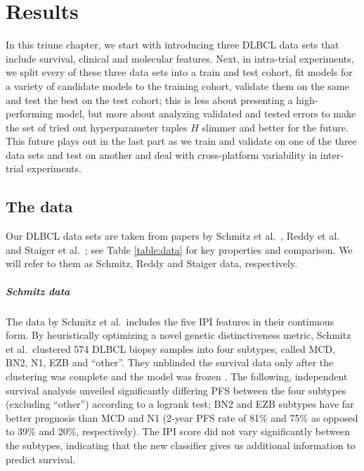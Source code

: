 \chapter{Results} \label{chap:results}

In this triune chapter, we start with introducing three DLBCL data sets that include 
survival, clinical and molecular features. Next, in intra-trial experiments, we split every of these 
three data sets into 
a train and test cohort, fit models for a variety of candidate models to the training 
cohort, validate them on the same and test the best on the test cohort; this is less about presenting a 
high-performing model, but more about analyzing validated and tested errors to make the set of tried 
out hyperparameter tuples $H$ slimmer and 
better for the future. This future plays out in the last part as we train and validate on one of 
the three data sets and test on another and deal with cross-platform variability in inter-trial 
experiments.

\section{The data}

Our DLBCL data sets are taken from papers by Schmitz et al.\ \cite{schmitz18}, Reddy et al.\ 
\cite{reddy17} and Staiger et al.\ \cite{staiger20}; see Table \ref{table:data} for key properties 
and comparison. We will refer to them as Schmitz, Reddy and Staiger data, respectively.



\paragraph{Schmitz data}
The data by Schmitz et al.\ includes the five IPI features in their continuous form. 
By heuristically optimizing a novel genetic distinctiveness metric, Schmitz et al.\ 
clustered \num{574} DLBCL biopsy samples into four subtypes, called MCD, BN2, N1, EZB and ``other''. They 
unblinded the survival data only after the clustering was complete and the 
model was frozen \cite[Appendix 1, pp. 16--18]{schmitz18}. The following, independent survival analysis 
unveiled significantly differing PFS between the four subtypes (excluding 
``other'') according to a logrank test; BN2 and EZB subtypes have far better prognosis than MCD and 
N1 (2-year PFS rate of \num{81}\% and \num{75}\% as opposed to \num{39}\% and 
\num{20}\%, respectively). The IPI score did not vary significantly between the subtypes, 
indicating that the new classifier gives us additional information to predict survival.

